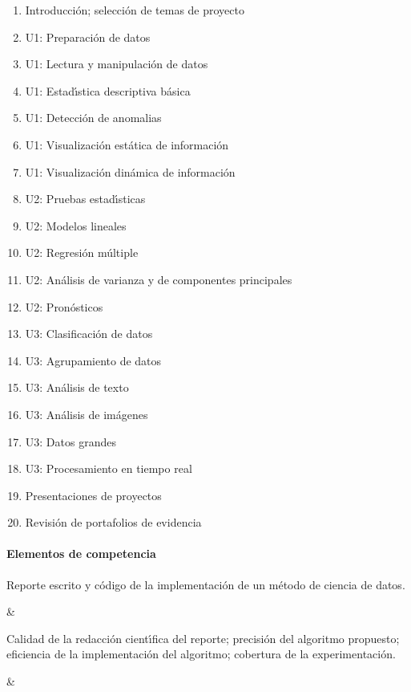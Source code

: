\begin{enumerate}[itemsep=-3pt]
\item{Introducci\'{o}n; selecci\'{o}n de temas de proyecto}
\item{U1: Preparaci\'{o}n de datos}
\item{U1: Lectura y manipulaci\'{o}n de datos}
\item{U1: Estad\'{\i}stica descriptiva b\'{a}sica}
\item{U1: Detecci\'{o}n de anomalias}
\item{U1: Visualizaci\'{o}n est\'{a}tica de informaci\'{o}n}
\item{U1: Visualizaci\'{o}n din\'{a}mica de informaci\'{o}n}
\item{U2: Pruebas estad\'{\i}sticas}
\item{U2: Modelos lineales}
\item{U2: Regresi\'{o}n m\'{u}ltiple}
\item{U2: An\'{a}lisis de varianza y de componentes principales}
\item{U2: Pron\'{o}sticos}
\item{U3: Clasificaci\'{o}n de datos}
\item{U3: Agrupamiento de datos}
\item{U3: An\'{a}lisis de texto}
\item{U3: An\'{a}lisis de im\'{a}genes}
\item{U3: Datos grandes}
\item{U3: Procesamiento en tiempo real}
\item{Presentaciones de proyectos}
\item{Revisi\'{o}n de portafolios de evidencia}
\end{enumerate}

\paragraph{Elementos de competencia}

\quad



Reporte escrito y c\'{o}digo de la implementaci\'{o}n de un m\'{e}todo
de ciencia de datos.

&

Calidad de la redacci\'{o}n cient\'{\i}fica del reporte; 
precisi\'{o}n del algoritmo propuesto;
eficiencia de la implementaci\'{o}n del algoritmo;
cobertura de la experimentaci\'{o}n.

&

